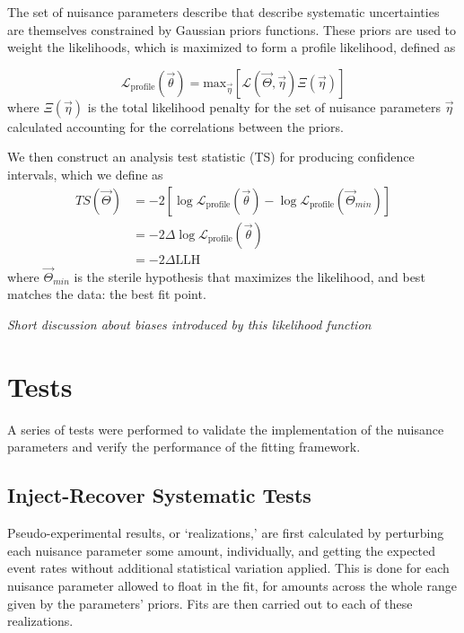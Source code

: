 \documentclass[main.tex]{subfiles}
\begin{document}
The set of nuisance parameters describe that describe systematic uncertainties are themselves constrained by Gaussian priors functions. 
These priors are used to weight the likelihoods, which is maximized to form a profile likelihood, defined as 

\begin{equation}
\mathcal{L}_{\text{profile}}\left(\vec{\theta}\right) = \text{max}_{\vec{\eta}}\left[\mathcal{L}(\vec{\Theta}, \vec{\eta}) \Xi(\vec{\eta}) \right]
\end{equation}
where $\Xi(\vec{\eta})$ is the total likelihood penalty for the set of nuisance parameters $\vec{\eta}$ calculated accounting for the correlations between the priors. 

We then construct an analysis test statistic (TS) for producing confidence intervals, which we define as 
\begin{equation}\begin{split}
TS(\vec{\Theta}) &= -2\left[ \log\mathcal{L}_{\text{profile}}(\vec{\theta}) - \log\mathcal{L}_{\text{profile}}(\vec{\Theta}_{min}) \right] \\
&= -2 \Delta \log\mathcal{L}_{\text{profile}}(\vec{\theta})\\
&=-2\Delta \text{LLH}
\end{split}\end{equation}
where $\vec{\Theta}_{min}$ is the sterile hypothesis that maximizes the likelihood, and best matches the data: the best fit point. 

\textit{Short discussion about biases introduced by this likelihood function}

\section{Tests}

A series of tests were performed to validate the implementation of the nuisance parameters and verify the performance of the fitting framework. 

\subsection{Inject-Recover Systematic Tests}

Pseudo-experimental results, or `realizations,' are first calculated by perturbing each nuisance parameter some amount, individually, and getting the expected event rates without additional statistical variation applied. 
This is done for each nuisance parameter allowed to float in the fit, for amounts across the whole range given by the parameters' priors. 
Fits are then carried out to each of these realizations.
\end{document}
